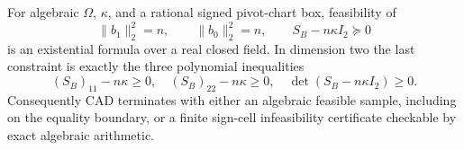 For algebraic \(\Omega\), \(\kappa\), and a rational signed pivot-chart box, feasibility of
\[
 \lVert b_1\rVert_2^2=n,
 \qquad \lVert b_0\rVert_2^2=n,
 \qquad S_B-n\kappa I_2\succeq0
\]
is an existential formula over a real closed field.  In dimension two the last constraint is exactly the three polynomial inequalities
\[
 (S_B)_{11}-n\kappa\ge0,
 \quad (S_B)_{22}-n\kappa\ge0,
 \quad \det(S_B-n\kappa I_2)\ge0.
\]
Consequently CAD terminates with either an algebraic feasible sample, including on the equality boundary, or a finite sign-cell infeasibility certificate checkable by exact algebraic arithmetic.